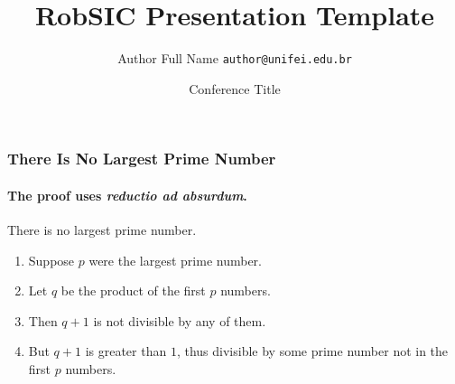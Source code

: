 \documentclass{beamer}
\title{RobSIC Presentation Template}
\date[SIGLA 22]{Conference Title}
\author[Author]{Author Full Name \texttt{author@unifei.edu.br}}
\begin{document}
\begin{frame}
\titlepage
\end{frame}


\begin{frame}
\frametitle{There Is No Largest Prime Number}
\framesubtitle{The proof uses \textit{reductio ad absurdum}.}
\begin{theorem}
There is no largest prime number. \end{theorem}
\begin{enumerate}
\item<1-| alert@1> Suppose $p$ were the largest prime number.
\item<2-> Let $q$ be the product of the first $p$ numbers.
\item<3-> Then $q+1$ is not divisible by any of them.
\item<1-> But $q + 1$ is greater than $1$, thus divisible by some prime
number not in the first $p$ numbers.
\end{enumerate}
\end{frame}
\end{document}
